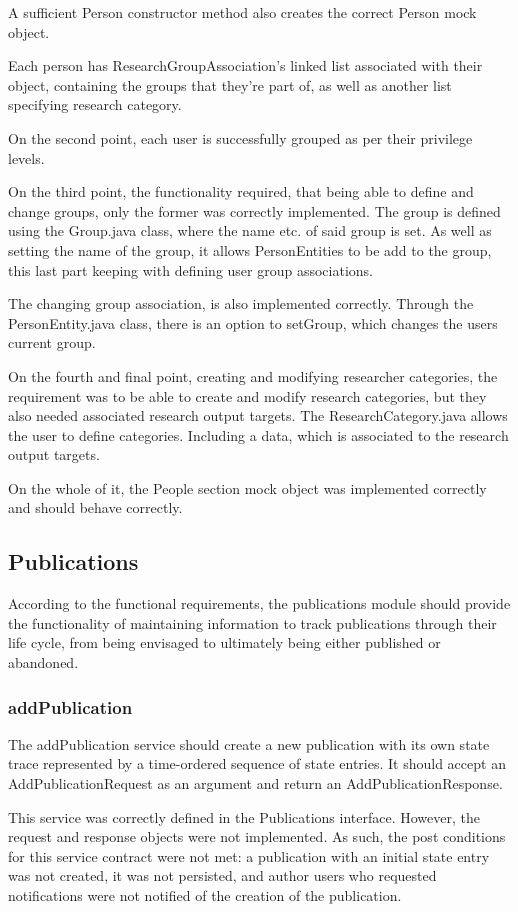 \documentclass[a4paper,10pt]{article}
\begin{document}
	A sufficient Person constructor method also creates the correct Person mock object.
	
	Each person has ResearchGroupAssociation's linked list associated with their object, containing the groups that they're part of, as well as another list specifying research category.
	
	On the second point, each user is successfully grouped as per their privilege levels. 
	
	On the third point, the functionality required, that being able to define and change groups, only the former was correctly implemented. The group is defined using the Group.java class, where the name etc. of said group is set. As well as setting the name of the group, it allows PersonEntities to be add to the group, this last part keeping with defining user group associations.
	
	The changing group association, is also implemented correctly. Through the PersonEntity.java class, there is an option to setGroup, which changes the users current group.
	
	On the fourth and final point, creating and modifying researcher categories, the requirement was to be able to create and modify research categories, but they also needed associated research output targets. The ResearchCategory.java allows the user to define categories. Including a data, which is associated to the research output targets.
	
	On the whole of it, the People section mock object was implemented correctly and should behave correctly. 
	

\subsection{Publications}
According to the functional requirements, the publications module should provide the functionality of maintaining information to track publications through their life cycle, from being envisaged to ultimately being either published or abandoned.
\subsubsection{addPublication}
The addPublication service should create a new publication with its own state trace represented by a time-ordered sequence of state entries. It should accept an AddPublicationRequest as an argument and return an AddPublicationResponse.

This service was correctly defined in the Publications interface. However, the request and response objects were not implemented. As such, the post conditions for this service contract were not met: a publication with an initial state entry was not created, it was not persisted, and author users who requested notifications were not notified of the creation of the publication.
\end{document}
